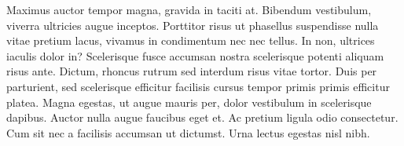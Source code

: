 \documentclass[11pt,]{article}
\begin{document}
Maximus auctor tempor magna, gravida in taciti at. Bibendum vestibulum,
viverra ultricies augue inceptos. Porttitor risus ut phasellus
suspendisse nulla vitae pretium lacus, vivamus in condimentum nec nec
tellus. In non, ultrices iaculis dolor in? Scelerisque fusce accumsan
nostra scelerisque potenti aliquam risus ante. Dictum, rhoncus rutrum
sed interdum risus vitae tortor. Duis per parturient, sed scelerisque
efficitur facilisis cursus tempor primis primis efficitur platea. Magna
egestas, ut augue mauris per, dolor vestibulum in scelerisque dapibus.
Auctor nulla augue faucibus eget et. Ac pretium ligula odio consectetur.
Cum sit nec a facilisis accumsan ut dictumst. Urna lectus egestas nisl
nibh.


\end{document}
